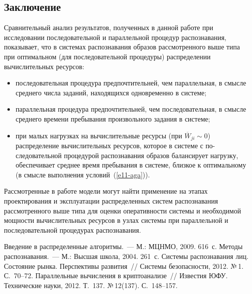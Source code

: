 \begin{multicols}{2}
\section{Заключение}

Сравнительный анализ результатов, полученных в данной работе при
исследовании последовательной и параллельной процедур распознавания,
показывает, что в системах распознавания образов рассмотренного выше типа
при оптимальном (для последовательной процедуры) распределении
вычислительных ресурсов:
\begin{itemize}
\item последовательная процедура предпочтительней, чем параллельная, в
смысле среднего чис\-ла заданий, находящихся одновременно в сис\-теме;
\item параллельная процедура предпочтительней, чем последовательная, в
смысле среднего времени пребывания произвольного задания в сис\-теме;
\item при малых нагрузках на вычислительные ресурсы (при
$\overline{W}_{ji}\sim 0$) распределение вы\-чис\-лительных ресурсов, которое в
системе с по-\linebreak следовательной процедурой распознавания \mbox{об\-ра\-зов} балансирует
нагрузку, обеспечивает среднее время пребывания в системе, близкое к
оптимальному (в смысле выполнения условий~(\ref{e11-aga})).
\end{itemize}

Рассмотренные в работе модели могут найти применение на этапах
проектирования и эксплуатации распределенных систем распознавания
рассмотренного выше типа для оценки оперативности системы и необходимой
мощности вычислительных ресурсов в узлах системы при параллельной и
последовательной процедурах распознавания.

\vspace*{-6pt}

{\small\frenchspacing
 {%
 \begin{thebibliography}{99}
 Введение в распределенные алгоритмы.~--- М.: МЦНМО, 2009.
616~с.
 Методы распознавания.~--- М.: Высшая
школа, 2004. 261~с.
 Системы распознавания лиц. Состояние рынка. Перспективы
развития~// Сис\-те\-мы безопасности, 2012. №\,1. С.~70--72.
 Параллельные вычисления
в криптоанализе~// Известия ЮФУ. Технические науки, 2012. Т.~137.
№\,12(137). С.~148--157.


\end{thebibliography}}}
\end{multicols}
